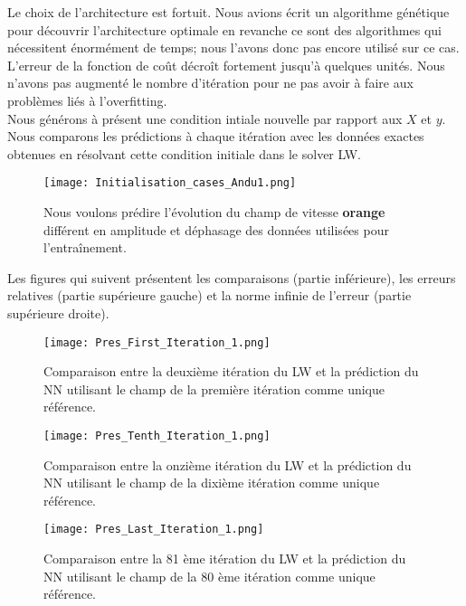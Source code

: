 \documentclass[a4paper,12pt]{article}
\newcommand\bk{\color{black}}
\numberwithin{equation}{section} %
\begin{document}
\noindent Le choix de l'architecture est fortuit. Nous avions écrit un algorithme génétique pour découvrir l'architecture optimale en revanche ce sont des algorithmes qui nécessitent énormément de temps; nous l'avons donc pas encore utilisé sur ce cas.\\
L'erreur de la fonction de coût décroît fortement jusqu'à quelques unités. Nous n'avons pas augmenté le nombre d'itération pour ne pas avoir à faire aux problèmes liés à l'overfitting.\\

\noindent Nous générons à présent une condition intiale nouvelle par rapport aux $X$  et $y$. Nous comparons les prédictions à chaque itération avec les données exactes obtenues en résolvant cette condition initiale dans le solver LW. \\
\begin{figure}[!ht]
\centering
\texttt{[image: Initialisation\_cases\_Andu1.png]}
\caption{\small{Nous voulons prédire l'évolution du champ de vitesse \color{orange}\textbf{orange} \bk différent en amplitude et déphasage des données utilisées pour l'entraînement.}}
\label{newinputNN}
\end{figure}

\noindent Les figures qui suivent présentent les comparaisons (partie inférieure), les erreurs relatives (partie supérieure gauche) et la norme infinie de l'erreur (partie supérieure droite).

\begin{figure}[!ht]
	\centering
	\texttt{[image: Pres\_First\_Iteration\_1.png]}
	\caption{\small{Comparaison entre la deuxième itération du LW et la prédiction du NN utilisant le champ de la première itération comme unique référence.}}
	\label{FirstItNewNN1}
\end{figure} 

\pagebreak

\begin{figure}[!ht]
	\centering
	\texttt{[image: Pres\_Tenth\_Iteration\_1.png]}
	\caption{\small{Comparaison entre la onzième itération du LW et la prédiction du NN utilisant le champ de la dixième itération comme unique référence.}}
	\label{10ItNewNN1}
\end{figure} 

\begin{figure}[!ht]
	\centering
	\texttt{[image: Pres\_Last\_Iteration\_1.png]}
	\caption{\small{Comparaison entre la 81 ème itération du LW et la prédiction du NN utilisant le champ de la 80 ème itération comme unique référence.}}
	\label{LastItNewNN1}
\end{figure}
\end{document}
